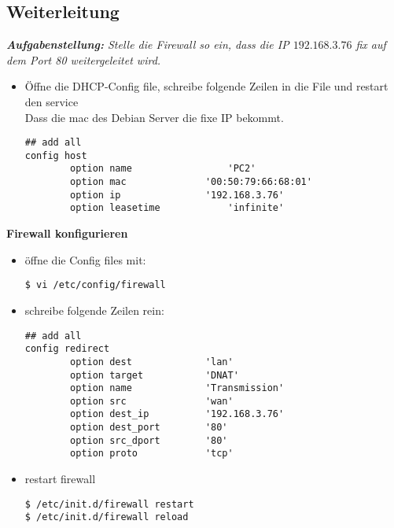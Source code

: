 \newpage

\subsection{Weiterleitung}
\textit{\textbf{Aufgabenstellung: } Stelle die Firewall so ein, dass die IP $192.168.3.76$ fix auf dem Port 80 weitergeleitet wird.}
\begin{itemize}
\item Öffne die DHCP-Config file, schreibe folgende Zeilen in die File und restart den service \\ Dass die mac des Debian Server die fixe IP bekommt.
\begin{verbatim}
## add all
config host
        option name 				'PC2'
        option mac 				'00:50:79:66:68:01'
        option ip 				'192.168.3.76'
        option leasetime			'infinite'
\end{verbatim}
\end{itemize}
\textbf{Firewall konfigurieren}
\begin{itemize}
\item öffne die Config files mit:
\begin{verbatim}
$ vi /etc/config/firewall
\end{verbatim}
\item schreibe folgende Zeilen rein:
\begin{verbatim}
## add all
config redirect                                        
        option dest             'lan'              
        option target           'DNAT'             
        option name             'Transmission'         
        option src              'wan'               
        option dest_ip          '192.168.3.76'         
        option dest_port        '80'                   
        option src_dport        '80'               
        option proto            'tcp'  
\end{verbatim}
\item restart firewall
\begin{verbatim}
$ /etc/init.d/firewall restart
$ /etc/init.d/firewall reload
\end{verbatim}
\end{itemize}

